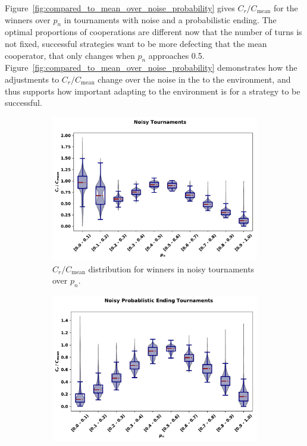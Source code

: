 Figure~\ref{fig:compared_to_mean_over_noise_probability} gives \(C_r /
C_{\text{mean}}\) for the winners over \(p_n\) in tournaments with noise and a
probabilistic ending. The optimal proportions of cooperations are different
now that the number of turns is not fixed, successful strategies
want to be more defecting that the mean cooperator, that only changes when
\(p_n\) approaches 0.5. Figure~\ref{fig:compared_to_mean_over_noise_probability}
demonstrates how the adjustments to \(C_r /C_{\text{mean}}\) change over the
noise in the to the environment, and thus supports how important adapting to
the environment is for a strategy to be successful.

\begin{figure}[!htbp]
    \centering
    \begin{subfigure}{0.485\textwidth}
        \centering
        \includegraphics[width=\textwidth]{../images/noisy_discussion_over_noise.pdf}
        \caption{\(C_r / C_{\text{mean}}\) distribution for winners in noisy tournaments over
        \(p_n\).}\label{fig:noisy_discussion_over_noise}
    \end{subfigure}
    \hfill
    \begin{subfigure}{0.485\textwidth}
        \centering
        \includegraphics[width=\textwidth]{../images/noisy_probend_discussion_over_noise.pdf}

\end{subfigure}
\end{figure}
